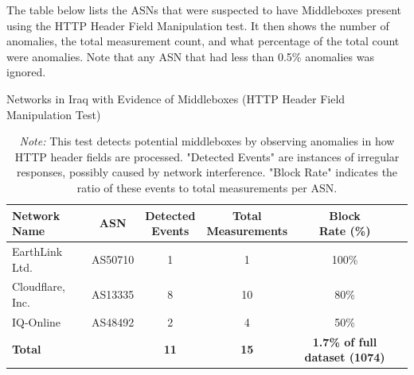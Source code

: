 The table below lists the ASNs that were suspected to have Middleboxes present using the HTTP Header Field Manipulation test. It then shows the number of anomalies, the total measurement count, and what percentage of the total count were anomalies. Note that any ASN that had less than 0.5\% anomalies was ignored.

\vspace{2em}

\begin{table}[H]
\centering
\caption{Networks in Iraq with Evidence of Middleboxes (HTTP Header Field Manipulation Test)}
\begin{tabular}{lccccc}
\toprule
\textbf{Network Name} & \textbf{ASN} & \shortstack{\textbf{Detected} \\ \textbf{Events}} & \shortstack{\textbf{Total} \\ \textbf{Measurements}} & \shortstack{\textbf{Block} \\ \textbf{Rate (\%)}} \\
\midrule
EarthLink Ltd.        & AS50710  & 1 & 1  & 100\%  \\
Cloudflare, Inc.      & AS13335  & 8 & 10 & 80\%   \\
IQ-Online             & AS48492  & 2 & 4  & 50\%   \\
\bottomrule
\textbf{Total} & & \textbf{11} & \textbf{15} & \textbf{1.7\% of full dataset (1074)} \\
\end{tabular}

\vspace{1em}

\begin{minipage}{0.95\linewidth}
\caption*{\textit{Note:} This test detects potential middleboxes by observing anomalies in how HTTP header fields are processed. "Detected Events" are instances of irregular responses, possibly caused by network interference. "Block Rate" indicates the ratio of these events to total measurements per ASN.}
\end{minipage}
\label{tab:middlebox_http_header}
\end{table}


